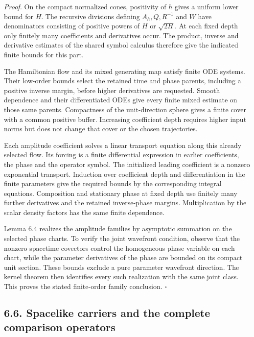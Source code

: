 \documentclass[
  english,
  11pt,
  reqno]{amsart}
\begin{document}
\emph{Proof.} On the compact normalized cones, positivity of \(h\) gives
a uniform lower bound for \(H\). The recursive divisions defining
\(A_h,Q,R^{-1}\) and \(W\) have denominators consisting of positive
powers of \(H\) or \(\sqrt{2H}\). At each fixed depth only finitely many
coefficients and derivatives occur. The product, inverse and derivative
estimates of the shared symbol calculus therefore give the indicated
finite bounds for this part.

The Hamiltonian flow and its mixed generating map satisfy finite ODE
systems. Their low-order bounds select the retained time and phase
parents, including a positive inverse margin, before higher derivatives
are requested. Smooth dependence and their differentiated ODEs give
every finite mixed estimate on those same parents. Compactness of the
unit-direction sphere gives a finite cover with a common positive
buffer. Increasing coefficient depth requires higher input norms but
does not change that cover or the chosen trajectories.

Each amplitude coefficient solves a linear transport equation along this
already selected flow. Its forcing is a finite differential expression
in earlier coefficients, the phase and the operator symbol. The
initialized leading coefficient is a nonzero exponential transport.
Induction over coefficient depth and differentiation in the finite
parameters give the required bounds by the corresponding integral
equations. Composition and stationary phase at fixed depth use finitely
many further derivatives and the retained inverse-phase margins.
Multiplication by the scalar density factors has the same finite
dependence.

Lemma 6.4 realizes the amplitude families by asymptotic summation on the
selected phase charts. To verify the joint wavefront condition, observe
that the nonzero spacetime covectors control the homogeneous phase
variable on each chart, while the parameter derivatives of the phase are
bounded on its compact unit section. These bounds exclude a pure
parameter wavefront direction. The kernel theorem then identifies every
such realization with the same joint class. This proves the stated
finite-order family conclusion. \hfill\(\square\)

\subsection{6.6. Spacelike carriers and the complete comparison
operators}\label{spacelike-carriers-and-the-complete-comparison-operators}\label{sec:online-wave-carriers}
\end{document}
